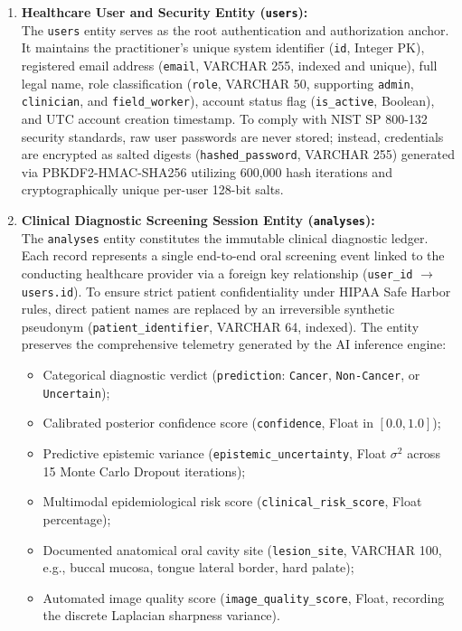 \documentclass[12pt,a4paper,oneside]{report}
\begin{document}
\begin{enumerate}[label=\textbf{\arabic*.}, leftmargin=*]
    \item \textbf{Healthcare User and Security Entity (\texttt{users}):} \\
    The \texttt{users} entity serves as the root authentication and authorization anchor. It maintains the practitioner's unique system identifier (\texttt{id}, Integer PK), registered email address (\texttt{email}, VARCHAR 255, indexed and unique), full legal name, role classification (\texttt{role}, VARCHAR 50, supporting \texttt{admin}, \texttt{clinician}, and \texttt{field\_worker}), account status flag (\texttt{is\_active}, Boolean), and UTC account creation timestamp. To comply with NIST SP 800-132 security standards, raw user passwords are never stored; instead, credentials are encrypted as salted digests (\texttt{hashed\_password}, VARCHAR 255) generated via PBKDF2-HMAC-SHA256 utilizing 600,000 hash iterations and cryptographically unique per-user 128-bit salts.
    
    \item \textbf{Clinical Diagnostic Screening Session Entity (\texttt{analyses}):} \\
    The \texttt{analyses} entity constitutes the immutable clinical diagnostic ledger. Each record represents a single end-to-end oral screening event linked to the conducting healthcare provider via a foreign key relationship (\texttt{user\_id} $\rightarrow$ \texttt{users.id}). To ensure strict patient confidentiality under HIPAA Safe Harbor rules, direct patient names are replaced by an irreversible synthetic pseudonym (\texttt{patient\_identifier}, VARCHAR 64, indexed). The entity preserves the comprehensive telemetry generated by the AI inference engine:
    \begin{itemize}
        \item Categorical diagnostic verdict (\texttt{prediction}: \texttt{Cancer}, \texttt{Non-Cancer}, or \texttt{Uncertain});
        \item Calibrated posterior confidence score (\texttt{confidence}, Float in $[0.0, 1.0]$);
        \item Predictive epistemic variance (\texttt{epistemic\_uncertainty}, Float $\sigma^2$ across 15 Monte Carlo Dropout iterations);
        \item Multimodal epidemiological risk score (\texttt{clinical\_risk\_score}, Float percentage);
        \item Documented anatomical oral cavity site (\texttt{lesion\_site}, VARCHAR 100, e.g., buccal mucosa, tongue lateral border, hard palate);
        \item Automated image quality score (\texttt{image\_quality\_score}, Float, recording the discrete Laplacian sharpness variance).
    \end{itemize}
    

\end{enumerate}
\end{document}
